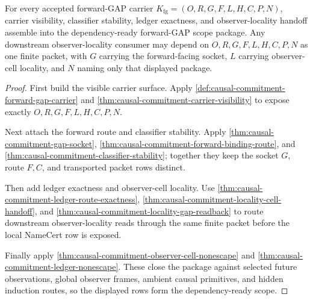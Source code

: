 \begin{theorem}
\label{thm:causal-commitment-forward-gap-scope-package}
For every accepted forward-GAP carrier $K_{\mathrm{fg}}=(O,R,G,F,L,H,C,P,N)$, carrier visibility, classifier stability, ledger exactness, and observer-locality handoff assemble into the dependency-ready forward-GAP scope package. Any downstream observer-locality consumer may depend on $O,R,G,F,L,H,C,P,N$ as one finite packet, with $G$ carrying the forward-facing socket, $L$ carrying observer-cell locality, and $N$ naming only that displayed package.
\end{theorem}
\begin{proof}
First build the visible carrier surface. Apply \autoref{def:causal-commitment-forward-gap-carrier} and \autoref{thm:causal-commitment-carrier-visibility} to expose exactly $O,R,G,F,L,H,C,P,N$.

Next attach the forward route and classifier stability. Apply \autoref{thm:causal-commitment-gap-socket}, \autoref{thm:causal-commitment-forward-binding-route}, and \autoref{thm:causal-commitment-classifier-stability}; together they keep the socket $G$, route $F,C$, and transported packet rows distinct.

Then add ledger exactness and observer-cell locality. Use \autoref{thm:causal-commitment-ledger-route-exactness}, \autoref{thm:causal-commitment-locality-cell-handoff}, and \autoref{thm:causal-commitment-locality-gap-readback} to route downstream observer-locality reads through the same finite packet before the local NameCert row is exposed.

Finally apply \autoref{thm:causal-commitment-observer-cell-nonescape} and \autoref{thm:causal-commitment-ledger-nonescape}. These close the package against selected future observations, global observer frames, ambient causal primitives, and hidden induction routes, so the displayed rows form the dependency-ready scope.
\end{proof}

